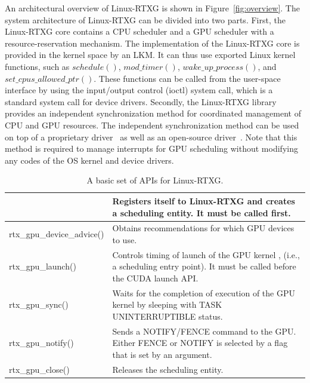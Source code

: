 An architectural overview of Linux-RTXG is shown in Figure~\ref{fig:overview}.
The system architecture of Linux-RTXG can be divided into two parts.
First, the Linux-RTXG core contains a CPU scheduler and a GPU scheduler with a resource-reservation mechanism.
The implementation of the Linux-RTXG core is provided in the kernel space by an LKM.
It can thus use exported Linux kernel functions, such as $schedule()$, $mod\_timer()$, $wake\_up\_process()$, and $set\_cpus\_allowed\_ptr()$.
These functions can be called from the user-space interface by using the input/output control (ioctl) system call, which is a standard system call for device drivers.
Secondly, the Linux-RTXG library provides an independent synchronization method for coordinated management of CPU and GPU resources.
The independent synchronization method can be used on top of a proprietary driver~\cite{nvidia:cuda_zone} as well as an open-source driver~\cite{nouveau}.
Note that this method is required to manage interrupts for GPU scheduling without modifying any codes of the OS kernel and device drivers.

\begin{table}[!t]
\begin{center}
\caption{A basic set of APIs for Linux-RTXG.}
\label{tab:rtx-api}
\ifthesis
\begin{tabular}{|l|p{25em}|} \hline
\else
\begin{tabular}{|l|p{53em}|} \hline
\fi
rtx\_gpu\_open() & Registers itself to Linux-RTXG and creates a scheduling entity. It must be called first. \\ \hline
rtx\_gpu\_device\_advice() & Obtains recommendations for which GPU devices to use. \\ \hline
rtx\_gpu\_launch() & Controls timing of launch of the GPU kernel , (i.e., a scheduling entry point). It must be called before the CUDA launch API. \\ \hline
rtx\_gpu\_sync() & Waits for the completion of execution of the GPU kernel by sleeping with TASK UNINTERRUPTIBLE status. \\ \hline
rtx\_gpu\_notify() & Sends a NOTIFY/FENCE command to the GPU. Either FENCE or NOTIFY is selected by a flag that is set by an argument.\\ \hline
rtx\_gpu\_close() & Releases the scheduling entity.\\ \hline
\end{tabular}
\end{center}
\vspace{-4mm}
\end{table}

